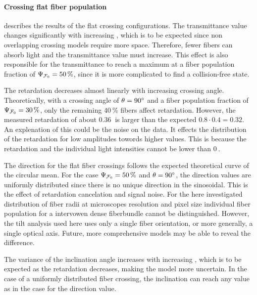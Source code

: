 \paragraph{Crossing flat fiber population}
 describes the results of the flat crossing configurations.
The transmittance value changes significantly with increasing \modelOmega{}, which is to be expected since non overlapping crossing models require more space.
Therefore, fewer fibers can absorb light and the transmittance value must increase.
This effect is also responsible for the transmittance to reach a maximum at a fiber population fraction of $\textnormal{$\Psi_{\textnormal{$\mathcal{F}_0$}}$}=\SI{50}{\percent}$, since it is more complicated to find a collision-free state.
\par
%
The retardation decreases almost linearly with increasing crossing angle.
Theoretically, with a crossing angle of $\textnormal{$\theta$}=\SI{90}{\degree}$ and a fiber population fraction of $\textnormal{$\Psi_{\textnormal{$\mathcal{F}_0$}}$}=\SI{30}{\percent}$, only the remaining $\SI{40}{\percent}$ fibers affect retardation.
However, the measured retardation of about $\SI{0.36}{}$ is larger than the expected $0.8\cdot 0.4 = 0.32$.
An explenation of this could be the noise on the data.
It effects the distribution of the retardation for low amplitudes towords higher values.
This is because the retardation and the individual light intensities cannot be lower than $\SI{0}{}$.
\par
%
The direction for the flat fiber crossings follows the expected theoretical curve of the circular mean.
For the case $\textnormal{$\Psi_{\textnormal{$\mathcal{F}_0$}}$}=\SI{50}{\percent}$ and $\textnormal{$\theta$}=\SI{90}{\degree}$, the direction values are uniformly distributed since there is no unique direction in the sinosoidal.
This is the effect of retardation cancelation and signal noise.
For the here investigated distribution of fiber radii at microscopes resolution and pixel size individual fiber population for a intervowen dense fiberbundle cannot be distinguished.
However, the tilt analysis used here uses only a single fiber orientation, or more generally, a single optical axis.
Future, more comprehensive models may be able to reveal the difference.
\par
%
The variance of the inclination angle increases with increasing \modelOmega{}, which is to be expected as the retardation decreases, making the model more uncertain.
In the case of a uniformly distributed fiber crossing, the inclination can reach any value as in the case for the direction value.
